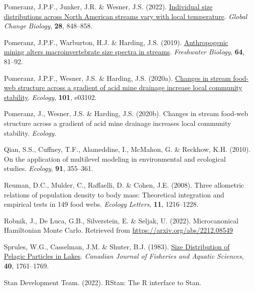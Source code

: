 \documentclass[
  12pt,
]{article}
\newlength{\cslhangindent}
\newlength{\cslentryspacingunit} %
\newenvironment{CSLReferences}[2] %
 {%
  \setlength{\parindent}{0pt}
  \ifodd #1
  \let\oldpar\par
  \def\par{\hangindent=\cslhangindent\oldpar}
  \fi
  \setlength{\parskip}{#2\cslentryspacingunit}
 }%
 {}
\begin{document}
\begin{CSLReferences}{1}{0}
\leavevmode{}%
Pomeranz, J.P.F., Junker, J.R. \& Wesner, J.S. (2022).
\href{https://doi.org/10.1111/gcb.15862}{Individual size distributions
across {North American} streams vary with local temperature}.
\emph{Global Change Biology}, \textbf{28}, 848--858.

\leavevmode{}%
Pomeranz, J.P.F., Warburton, H.J. \& Harding, J.S. (2019).
\href{https://doi.org/10.1111/fwb.13196}{Anthropogenic mining alters
macroinvertebrate size spectra in streams}. \emph{Freshwater Biology},
\textbf{64}, 81--92.

\leavevmode{}%
Pomeranz, J.P.F., Wesner, J.S. \& Harding, J.S. (2020a).
\href{https://doi.org/10.1002/ecy.3102}{Changes in stream food-web
structure across a gradient of acid mine drainage increase local
community stability}. \emph{Ecology}, \textbf{101}, e03102.

\leavevmode{}%
Pomeranz, J., Wesner, J.S. \& Harding, J.S. (2020b). Changes in stream
food-web structure across a gradient of acid mine drainage increases
local community stability. \emph{Ecology}.

\leavevmode{}%
Qian, S.S., Cuffney, T.F., Alameddine, I., McMahon, G. \& Reckhow, K.H.
(2010). On the application of multilevel modeling in environmental and
ecological studies. \emph{Ecology}, \textbf{91}, 355--361.

\leavevmode{}%
Reuman, D.C., Mulder, C., Raffaelli, D. \& Cohen, J.E. (2008). Three
allometric relations of population density to body mass: Theoretical
integration and empirical tests in 149 food webs. \emph{Ecology
Letters}, \textbf{11}, 1216--1228.

\leavevmode{}%
Robnik, J., De Luca, G.B., Silverstein, E. \& Seljak, U. (2022).
Microcanonical {Hamiltonian Monte Carlo}. Retrieved from
\url{https://arxiv.org/abs/2212.08549}

\leavevmode{}%
Sprules, W.G., Casselman, J.M. \& Shuter, B.J. (1983).
\href{https://doi.org/10.1139/f83-205}{Size {Distribution} of {Pelagic
Particles} in {Lakes}}. \emph{Canadian Journal of Fisheries and Aquatic
Sciences}, \textbf{40}, 1761--1769.

\leavevmode{}%
Stan Development Team. (2022). {RStan}: The {R} interface to {Stan}.


\end{CSLReferences}
\end{document}
